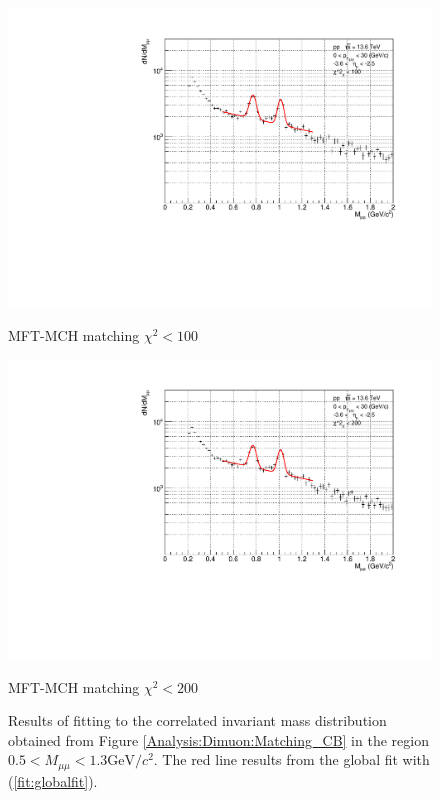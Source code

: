 \begin{figure}[H]
\begin{minipage}{0.45\textwidth}
                \end{minipage}
                \\
                \vspace{1em}
                \begin{minipage}{0.45\textwidth}
                    \centering
                    \includegraphics[width=\textwidth]{fig/3_4_4_Fit_chi2_100.pdf}
                    \caption*{MFT-MCH matching $\chi^2 < 100$}
                \end{minipage}
                \hfill
                \begin{minipage}{0.45\textwidth}
                    \centering
                    \includegraphics[width=\textwidth]{fig/3_4_4_Fit_chi2_200.pdf}
                    \caption*{MFT-MCH matching $\chi^2 < 200$}
                \end{minipage}
                \caption{Results of fitting to the correlated invariant mass distribution obtained from Figure \ref{Analysis:Dimuon:Matching_CB} in the region $0.5 < M_{\mu\mu} < 1.3 \mathrm{GeV/}c^2$. The red line results from the global fit with (\ref{fit:globalfit}).}
                \label{Analysis:Dimuon:Matching_Fit}
            \end{figure}
